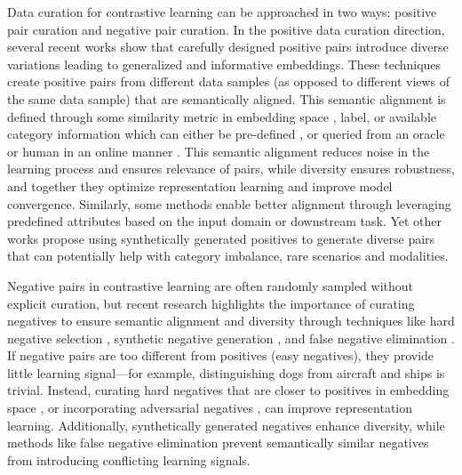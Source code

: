 Data curation for contrastive learning can be approached in two ways: positive pair curation and negative pair curation. %
In the positive data curation direction, several recent works \cite{dwibedi2021little,wu2023synthetic,ayush2021geography} show that carefully designed positive pairs introduce diverse variations leading to generalized and informative embeddings. These techniques create positive pairs from different data samples (as opposed to different views of the same data sample) that are semantically aligned. This semantic alignment is defined through some similarity metric in embedding space \cite{koohpayegani2021mean,estepa2023all4one}, label, or available category information which can either be pre-defined \cite{khosla2020supervised}, or queried from an oracle or human in an online manner \cite{ghose2023tailoring}.  This semantic alignment reduces noise in the learning process and ensures relevance of pairs, while diversity ensures robustness, and together they optimize representation learning and improve model convergence. Similarly, some methods \cite{ayush2021geography} enable better alignment through leveraging predefined attributes based on the input domain or downstream task. Yet other works \cite{wu2023synthetic,zeng2024contrastive} propose using synthetically generated positives to generate diverse pairs that can potentially help with category imbalance, rare scenarios and modalities. 

Negative pairs in contrastive learning are often randomly sampled without explicit curation, but recent research highlights the importance of curating negatives to ensure semantic alignment and diversity through techniques like hard negative selection \cite{unremix}, synthetic negative generation \cite{giakoumoglou2024synco}, and false negative elimination \cite{huynh2022boosting}.
If negative pairs are too different from positives (easy negatives), they provide little learning signal—for example, distinguishing dogs from aircraft and ships is trivial. Instead, curating hard negatives that are closer to positives in embedding space \cite{robinson2020contrastive}, or incorporating adversarial negatives \cite{hu2021adco}, can improve representation learning. Additionally, synthetically generated negatives \cite{giakoumoglou2024synco,dong2024synthetic} enhance diversity, while methods like false negative elimination \cite{huynh2022boosting,chuang2020debiased} prevent semantically similar negatives from introducing conflicting learning signals. 

